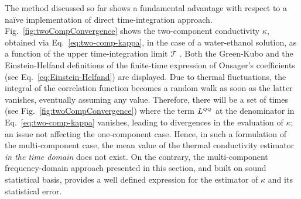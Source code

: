 The method discussed so far shows a fundamental advantage with respect to a na\"ive implementation of direct time-integration approach.
Fig.~\ref{fig:twoCompConvergence} shows the two-component conductivity $\kappa$, obtained via Eq.~\eqref{eq:two-comp-kappa}, in the case of a water-ethanol solution, as a function of the upper time-integration limit $\mathcal{T}$ \citep{Bertossa2018}. Both the Green-Kubo and the Einstein-Helfand definitions of the finite-time expression of Onsager's coefficients (see Eq.~\eqref{eq:Einstein-Helfand}) are displayed.
Due to thermal fluctuations, the integral of the correlation function becomes a random walk as soon as the latter vanishes, eventually assuming any value. Therefore, there will be a set of times (see Fig.~\ref{fig:twoCompConvergence}) where the term $L^{{\scriptscriptstyle Q}{\scriptscriptstyle Q}}$ at the denominator in Eq.~\eqref{eq:two-comp-kappa} vanishes, leading to divergences in the evaluation of $\kappa$; an issue not affecting the one-component case. Hence, in such a formulation of the multi-component case, the mean value of the thermal conductivity estimator \textit{in the time domain} does not exist. On the contrary, the multi-component frequency-domain approach presented in this section, and built on sound statistical basis, provides a well defined expression for the estimator of $\kappa$ and its statistical error.


